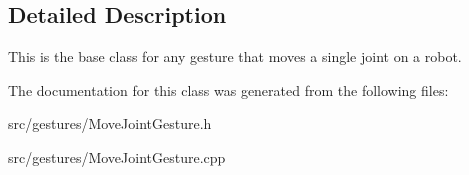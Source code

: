 \subsection{Detailed Description}
This is the base class for any gesture that moves a single joint on a robot. 

The documentation for this class was generated from the following files\+:\begin{DoxyCompactItemize}
\item 
src/gestures/Move\+Joint\+Gesture.\+h\item 
src/gestures/Move\+Joint\+Gesture.\+cpp\end{DoxyCompactItemize}
